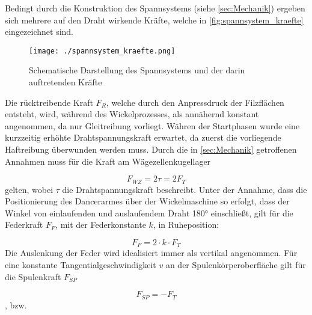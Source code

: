 Bedingt durch die Konstruktion des Spannsystems (siehe \autoref{sec:Mechanik}) ergeben sich mehrere auf den Draht wirkende Kräfte, welche in \autoref{fig:spannsystem_kraefte} eingezeichnet sind.

\begin{figure}[H]
    \centering
    \texttt{[image: ./spannsystem\_kraefte.png]}
    \caption{Schematische Darstellung des Spannsystems und der darin auftretenden Kräfte}
    \label{fig:spannsystem_kraefte}
\end{figure}
Die rücktreibende Kraft $F_R$, welche durch den Anpressdruck der Filzflächen entsteht, wird, während des Wickelprozesses, als annähernd konstant angenommen, da nur Gleitreibung vorliegt. Währen der Startphasen wurde eine kurzzeitig erhöhte Drahtspannungskraft erwartet, da zuerst die vorliegende Haftreibung überwunden werden muss. Durch die in \autoref{sec:Mechanik} getroffenen Annahmen muss für die Kraft am Wägezellenkugellager

\begin{equation}
    \label{eq:wz_kraft}
    F_{WZ} = 2  \tau = 2  F_T
\end{equation}
gelten, wobei $\tau$ die Drahtspannungskraft beschreibt. Unter der Annahme, dass die Positionierung des Dancerarmes über der Wickelmaschine so erfolgt, dass der Winkel von einlaufenden und auslaufendem Draht 180° einschließt, gilt für die Federkraft $F_F$, mit der Federkonstante $k$, in Ruheposition:

\begin{equation}
    F_F = 2 \cdot k  \cdot F_T
\end{equation}
Die Auslenkung der Feder wird idealisiert immer als vertikal angenommen. Für eine konstante Tangentialgeschwindigkeit $v$ an der Spulenkörperoberfläche gilt für die Spulenkraft $F_{SP}$

\begin{equation}
    F_{SP} = -F_T
\end{equation}
, bzw.

